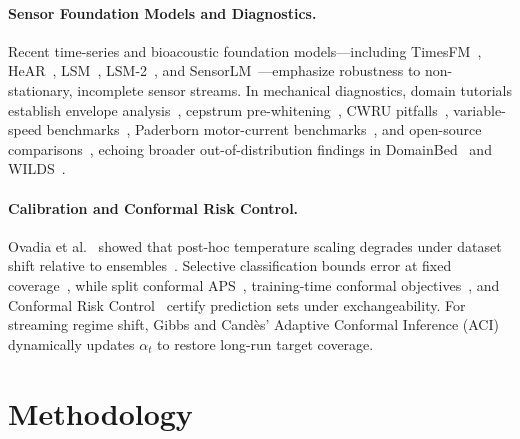 \documentclass[10pt,twocolumn]{article}
\begin{document}
\paragraph{Sensor Foundation Models and Diagnostics.}
Recent time-series and bioacoustic foundation models---including TimesFM~\cite{das2024timesfm}, HeAR~\cite{baur2024hear}, LSM~\cite{narayanswamy2025lsm}, LSM-2~\cite{xu2025lsm2}, and SensorLM~\cite{zhang2025sensorlm}---emphasize robustness to non-stationary, incomplete sensor streams. In mechanical diagnostics, domain tutorials establish envelope analysis~\cite{randall2011tutorial}, cepstrum pre-whitening~\cite{borghesani2013cepstrum}, CWRU pitfalls~\cite{smith2015cwru}, variable-speed benchmarks~\cite{huang2018uottawa}, Paderborn motor-current benchmarks~\cite{lessmeier2016paderborn}, and open-source comparisons~\cite{zhao2020deep}, echoing broader out-of-distribution findings in DomainBed~\cite{gulrajani2021domainbed} and WILDS~\cite{koh2021wilds}.

\paragraph{Calibration and Conformal Risk Control.}
Ovadia et al.~\cite{ovadia2019trust} showed that post-hoc temperature scaling degrades under dataset shift relative to ensembles~\cite{lakshminarayanan2017ensembles}. Selective classification bounds error at fixed coverage~\cite{geifman2017selective}, while split conformal APS~\cite{romano2020aps,angelopoulos2023gentle}, training-time conformal objectives~\cite{stutz2022conftr}, and Conformal Risk Control~\cite{angelopoulos2024crc} certify prediction sets under exchangeability. For streaming regime shift, Gibbs and Cand\`es' Adaptive Conformal Inference (ACI)~\cite{gibbs2021aci} dynamically updates $\alpha_t$ to restore long-run target coverage.

\section{Methodology}
\end{document}
